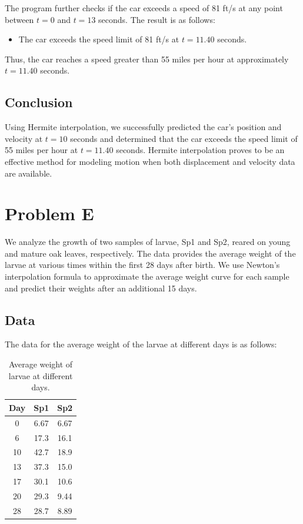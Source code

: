 \documentclass{article}
\begin{document}
The program further checks if the car exceeds a speed of 81 ft/s at any point between \( t = 0 \) and \( t = 13 \) seconds. The result is as follows:

\begin{itemize}
    \item The car exceeds the speed limit of 81 ft/s at \( t = 11.40 \) seconds.
\end{itemize}

Thus, the car reaches a speed greater than 55 miles per hour at approximately \( t = 11.40 \) seconds.

\subsection{Conclusion}

Using Hermite interpolation, we successfully predicted the car's position and velocity at \( t = 10 \) seconds and determined that the car exceeds the speed limit of 55 miles per hour at \( t = 11.40 \) seconds. Hermite interpolation proves to be an effective method for modeling motion when both displacement and velocity data are available.




\section{Problem E}
We analyze the growth of two samples of larvae, Sp1 and Sp2, reared on young and mature oak leaves, respectively. The data provides the average weight of the larvae at various times within the first 28 days after birth. We use Newton's interpolation formula to approximate the average weight curve for each sample and predict their weights after an additional 15 days.

\subsection{Data}
The data for the average weight of the larvae at different days is as follows:

\begin{table}[h]
\centering
\begin{tabular}{|c|c|c|}
\hline
Day & Sp1 & Sp2 \\
\hline
0 & 6.67 & 6.67 \\
6 & 17.3 & 16.1 \\
10 & 42.7 & 18.9 \\
13 & 37.3 & 15.0 \\
17 & 30.1 & 10.6 \\
20 & 29.3 & 9.44 \\
28 & 28.7 & 8.89 \\
\hline
\end{tabular}
\caption{Average weight of larvae at different days.}
\end{table}
\end{document}
